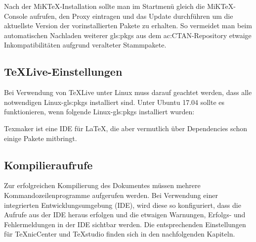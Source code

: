Nach der MiKTeX-Installation sollte man im Startmenü gleich die MiKTeX-Console aufrufen, den Proxy eintragen und das Update durchführen um die aktuellste Version der vorinstallierten Pakete zu erhalten.
So vermeidet man beim automatischen Nachladen weiterer \glspl{gls:pkg} aus dem \acrshort{ac:CTAN}-Repository etwaige Inkompatibilitäten aufgrund veralteter Stammpakete.


\subsection{TeXLive-Einstellungen}
\label{sec:TeXLive}
Bei Verwendung von TeXLive unter Linux muss darauf geachtet werden, dass alle notwendigen Linux-\glspl{gls:pkg} installiert sind.
Unter Ubuntu 17.04 sollte es funktionieren, wenn folgende Linux-\glspl{gls:pkg} installiert wurden:
\begin{itemize*}
	\item {}
	\item {}
	\item {}
	\item {}
	\item {}
	\item {}
	\item {}
	\item {}
\end{itemize*}
Texmaker ist eine IDE für \LaTeX, die aber vermutlich über Dependencies schon einige Pakete mitbringt.


\subsection{Kompilieraufrufe}
\label{sec:Aufruf}
Zur erfolgreichen Kompilierung des Dokumentes müssen mehrere
Kommandozeilenprogramme aufgerufen werden.
Bei Verwendung einer integrierten Entwicklungsumgebung (IDE),
wird diese so konfiguriert, dass die Aufrufe aus der IDE heraus erfolgen und
die etwaigen Warnungen, Erfolgs- und Fehlermeldungen in der IDE sichtbar werden.
Die entsprechenden Einstellungen für TeXnicCenter und TeXstudio finden sich
in den nachfolgenden Kapiteln.

